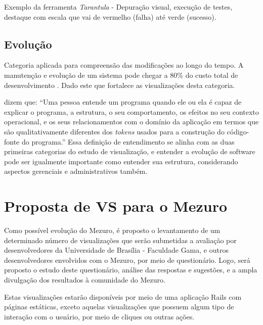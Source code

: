 Exemplo da ferramenta \textit{Tarantula} \cite{jones2002visualization} -
Depuração visual, execução de testes, destaque com escala que vai de vermelho
(falha) até verde (sucesso).

\subsection{Evolução}

Categoria aplicada para compreensão das modificações ao longo do tempo. A
manutenção e evolução de um sistema pode chegar a 80\% do custo total de
desenvolvimento \cite{pfleeger2005analyzing}. Dado este que fortalece as
visualizações desta categoria.

 dizem que: ``Uma pessoa entende um programa
quando ele ou ela é capaz de explicar o programa, a estrutura, o seu
comportamento, os efeitos no seu contexto operacional, e os seus relacionamentos
com o domínio da aplicação em termos que são qualitativamente diferentes dos
\textit{tokens} usados para a construção do código-fonte do programa.'' Essa
definição de entendimento se alinha com as duas primeiras categorias do estudo
de visualização, e entender a evolução de software pode ser igualmente
importante como entender sua estrutura, considerando aspectos gerenciais e
administrativos também.

\section{Proposta de VS para o Mezuro}

Como possível evolução do Mezuro, é proposto o levantamento de um determinado
número de visualizações que serão submetidas a avaliação por desenvolvedores da
Universidade de Brasília - Faculdade Gama, e outros desenvolvedores envolvidos
com o Mezuro, por meio de questionário. Logo, será proposto o estudo deste
questionário, análise das respostas e sugestões, e a ampla divulgação dos
resultados à comunidade do Mezuro.

Estas visualizações estarão disponíveis por meio de uma aplicação Rails com
páginas estáticas, exceto aquelas visualizações que possuem algum tipo de
interação com o usuário, por meio de cliques ou outras ações.
